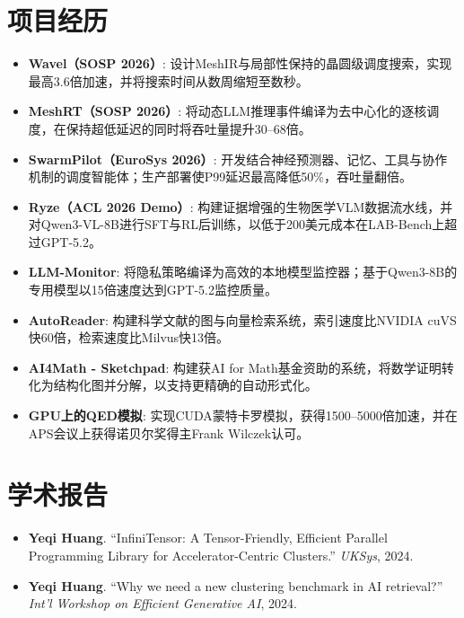 \documentclass[a4paper,20pt]{article}
\newcommand{\resumeItem}[2]{
  \item\small{
    \textbf{#1}{: #2 \vspace{-2pt}}
  }
}
\newcommand{\resumeSubItem}[2]{\resumeItem{#1}{#2}\vspace{-3pt}}
\newcommand{\resumeSubHeadingListStart}{\begin{itemize}[leftmargin=*]}
\newcommand{\resumeSubHeadingListEnd}{\end{itemize}}
\begin{document}
\section{项目经历}
\resumeSubHeadingListStart
\resumeSubItem{Wavel（SOSP 2026）}{设计MeshIR与局部性保持的晶圆级调度搜索，实现最高3.6倍加速，并将搜索时间从数周缩短至数秒。}
\resumeSubItem{MeshRT（SOSP 2026）}{将动态LLM推理事件编译为去中心化的逐核调度，在保持超低延迟的同时将吞吐量提升30--68倍。}
\resumeSubItem{SwarmPilot（EuroSys 2026）}{开发结合神经预测器、记忆、工具与协作机制的调度智能体；生产部署使P99延迟最高降低50\%，吞吐量翻倍。}
\resumeSubItem{Ryze（ACL 2026 Demo）}{构建证据增强的生物医学VLM数据流水线，并对Qwen3-VL-8B进行SFT与RL后训练，以低于200美元成本在LAB-Bench上超过GPT-5.2。}
\resumeSubItem{LLM-Monitor}{将隐私策略编译为高效的本地模型监控器；基于Qwen3-8B的专用模型以15倍速度达到GPT-5.2监控质量。}
\resumeSubItem{AutoReader}{构建科学文献的图与向量检索系统，索引速度比NVIDIA cuVS快60倍，检索速度比Milvus快13倍。}
\resumeSubItem{AI4Math - Sketchpad}{构建获AI for Math基金资助的系统，将数学证明转化为结构化图并分解，以支持更精确的自动形式化。}
\resumeSubItem{GPU上的QED模拟}{实现CUDA蒙特卡罗模拟，获得1500--5000倍加速，并在APS会议上获得诺贝尔奖得主Frank Wilczek认可。}

\resumeSubHeadingListEnd
\vspace{-10pt}


\section{学术报告}
{\small
\resumeSubHeadingListStart
\item [1] \textbf{Yeqi Huang}. ``InfiniTensor: A Tensor-Friendly, Efficient Parallel Programming Library for Accelerator-Centric Clusters.'' \textit{UKSys}, 2024.
\vspace{-5pt}
\item [2] \textbf{Yeqi Huang}. ``Why we need a new clustering benchmark in AI retrieval?'' \textit{Int'l Workshop on Efficient Generative AI}, 2024.
\resumeSubHeadingListEnd
}

\end{document}
